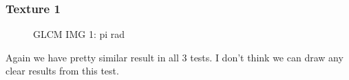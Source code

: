 \documentclass{article}
\begin{document}
	\subsubsection{Texture 1}
		\begin{figure}[h]%
			\centering
    		\qquad
    		\qquad
    		\qquad
    		
    		\caption{GLCM IMG 1: pi rad}%
    		\label{fig:GLCM_1}%
		\end{figure}
		Again we have pretty similar result in all 3 tests. I don't think we can draw any clear results from this test.
\newpage
\end{document}
